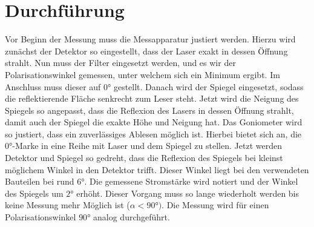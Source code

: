 \section{Durchführung}
\label{sec:Durchführung}
Vor Beginn der Messung muss die Messapparatur justiert werden. Hierzu wird zunächst der Detektor so eingestellt,
dass der Laser exakt in dessen Öffnung strahlt. 
Nun muss der Filter eingesetzt werden, und es wir der Polarisationswinkel gemessen, unter welchem sich ein Minimum ergibt.
Im Anschluss muss dieser auf $0\unit{\degree}$ gestellt.
Danach wird der Spiegel eingesetzt, sodass die reflektierende Fläche senkrecht zum Leser steht.
Jetzt wird die Neigung des Spiegels so angepasst, dass die Reflexion des Lasers in dessen Öffnung strahlt, damit auch der Spiegel die exakte 
Höhe und Neigung hat.
Das Goniometer wird so justiert, dass ein zuverlässiges Ablesen möglich ist. Hierbei bietet sich an, die $0\unit{\degree}$-Marke in eine Reihe mit Laser und dem Spiegel zu stellen.
Jetzt werden Detektor und Spiegel so gedreht, dass die Reflexion des Spiegels bei kleinst möglichem Winkel in den Detektor trifft. Dieser Winkel liegt bei den verwendeten 
Bauteilen bei rund $6\unit{\degree}$.
Die gemessene Stromstärke wird notiert und der Winkel des Spiegels um $2\unit{\degree}$ erhöht. Dieser Vorgang muss so lange wiederholt werden bis keine Messung mehr Möglich ist ($\alpha <90\unit{\degree})$.
Die Messung wird für einen Polarisationswinkel $90\unit{\degree}$ analog durchgeführt.